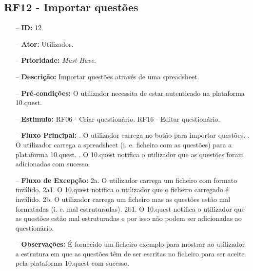 \subsection{RF12 - Importar questões}
\begin{itemize}
	\item[--] \textbf{ID:} 12
	\item[--]  \textbf{Ator:} Utilizador.
	\item[--]  \textbf{Prioridade:} \textit{Must Have}.
	\item[--]  \textbf{Descrição:} Importar questões através de uma spreadsheet. 
	\item[--]  \textbf{Pré-condições:} O utilizador necessita de estar autenticado na plataforma 10.quest.
	\item[--]  \textbf{Estimulo:}  
		\subitem RF06 - Criar questionário.
		\subitem RF16 - Editar questionário.
	\item[--]  \textbf{Fluxo Principal:} 
		. O utilizador carrega no botão para importar questões.
		. O utilizador carrega a spreadsheet (i. e. ficheiro com as questões) para a plataforma 10.quest.
		. O 10.quest notifica o utilizador que as questões foram adicionadas com sucesso.
	\item[--]  \textbf{Fluxo de Excepção:} 
		\subitem 2a. O utilizador carrega um ficheiro com formato inválido.
		\subitem 2a1. O 10.quest notifica o utilizador que o ficheiro carregado é inválido.
		\subitem 2b. O utilizador carrega um ficheiro mas as questões estão mal formatadas (i. e. mal estruturadas).
		\subitem 2b1. O 10.quest notifica o utilizador que as questões estão mal estruturadas e por isso não podem ser adicionadas ao questionário.
	\item[--]  \textbf{Observações:} É fornecido um ficheiro exemplo para mostrar ao utilizador a estrutura em que as questões têm de ser escritas no ficheiro para ser aceite pela plataforma 10.quest com sucesso.
\end{itemize}
\newpage

